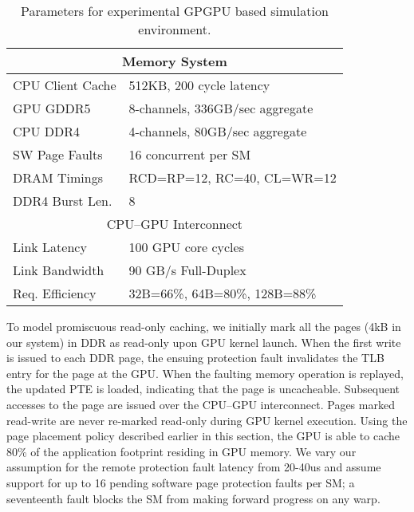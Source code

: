 \begin{table}[t]
\begin{center}
\begin{tabular}{|l|l|}
\hline
\multicolumn{2}{|c|}{Memory System}\\
\hline
CPU Client Cache & 512KB, 200 cycle latency\\
\hline
GPU GDDR5 & 8-channels, 336GB/sec aggregate\\
\hline
CPU DDR4& 4-channels, 80GB/sec aggregate\\
\hline
SW Page Faults& 16 concurrent per SM\\
\hline
DRAM Timings & \multicolumn{1}{|l|}{RCD=RP=12, RC=40, CL=WR=12}\\
\hline
DDR4 Burst Len.& 8\\
\hline
\hline
\multicolumn{2}{|c|}{CPU--GPU Interconnect}\\
\hline
Link Latency& 100 GPU core cycles\\
\hline
Link Bandwidth& 90 GB/s Full-Duplex\\
\hline
Req. Efficiency& 32B=66\%, 64B=80\%, 128B=88\%\\
\hline
\end{tabular}
\caption{Parameters for experimental GPGPU based simulation environment.}
\label{tab:sc-methodology}
\end{center}
\vspace{-.1in}
\end{table}

To model promiscuous read-only caching, we initially mark all the pages (4kB in
our system) in DDR as read-only upon GPU kernel launch. When the first write is
issued to each DDR page, the ensuing protection fault invalidates the TLB entry
for the page at the GPU.  When the faulting memory operation is replayed, the
updated PTE is loaded, indicating that the page is uncacheable.  Subsequent
accesses to the page are issued over the CPU--GPU interconnect.  Pages marked
read-write are never re-marked read-only during GPU kernel execution. Using the
page placement policy described earlier in this section, the GPU is able to
cache 80\% of the application footprint residing in GPU memory. We vary our
assumption for the remote protection fault latency from 20-40us and assume
support for up to 16 pending software page protection faults per SM; a
seventeenth fault blocks the SM from making forward progress on any warp.

